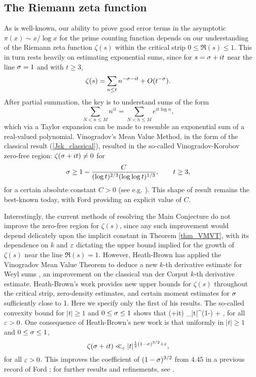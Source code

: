 \documentclass[brochure,english,12pt]{bourbaki}%
\begin{document}
\subsection{The Riemann zeta function}
As is well-known, our ability to prove good error terms in the asymptotic $\pi(x) \sim x/\log x$ for the prime counting function depends on our understanding of the Riemann zeta function $\zeta(s)$ within the critical strip $0 \leq \Re(s) \leq 1$.
This in turn rests heavily on estimating exponential sums, since for $s=\sigma+it$ near the line $\sigma=1$ and  with $t \geq 3$,
\[ \zeta( s) = \sum_{n \leq t} n^{-\sigma - it} + O(t^{-\sigma}).\]
After partial summation, the key is to understand sums of the form 
\[ \sum_{N < n \leq M} n^{it} = \sum_{N<n \leq M} e^{i t \log n},\]
which via a Taylor expansion can be made to resemble an exponential sum of a real-valued polynomial.
Vinogradov's Mean Value Method, in the form of the classical result (\ref{Jsk_classical}), 
resulted in the so-called Vinogradov-Korobov zero-free region: $\zeta(\sigma +it) \neq 0$ for
\[ \sigma \geq 1 - \frac{C}{(\log t)^{2/3} (\log \log t)^{1/3}}, \qquad t \geq 3,\]
for a certain absolute constant $C>0$ (see e.g. \cite[Ch. 6]{Ivi85}).
 This shape of result remains the best-known today, with Ford \cite{For02} providing an explicit value of $C$. 
 
 Interestingly, the current methods of resolving the Main Conjecture  do not improve the zero-free region for $\zeta(s)$, since any such improvement would depend delicately upon the implicit constant in Theorem \ref{thm_VMVT}, with its dependence on $k$ and $\varepsilon$ dictating the upper bound implied for the growth of $\zeta(s)$ near the line $\Re(s)=1$.
However, Heath-Brown has applied the Vinogradov Mean Value Theorem to deduce a new $k$-th derivative estimate for Weyl sums \cite{HB16x}, an improvement on the classical van der Corput $k$-th derivative estimate. Heath-Brown's  work provides new upper bounds for $\zeta(s)$ throughout the critical strip, zero-density estimates, and certain moment estimates for $\sigma$ sufficiently close to 1. Here we specify only the first of his results.
The so-called convexity bound for $|t| \geq 1$ and $0 \leq \sigma \leq 1$ shows that
\beq\label{zeta_convexity}
 \zeta(\sig+it) \ll_\ep |t|^{(1-\sig) + \ep}, 
 \eeq
for all $\varepsilon>0$.
One consequence of Heath-Brown's new work is that uniformly in $|t| \geq 1$ and $0 \leq \sigma \leq 1$, 
  \[ \zeta(\sigma + it) \ll_\varepsilon |t|^{\frac{1}{2}(1-\sigma)^{3/2}+\varepsilon},\]
  for all $\varepsilon>0$.
  This improves the coefficient of $(1-\sigma)^{3/2}$ from $4.45$ in a previous record of Ford \cite{For02}; for further results and refinements, see \cite{HB16x}.
\end{document}
